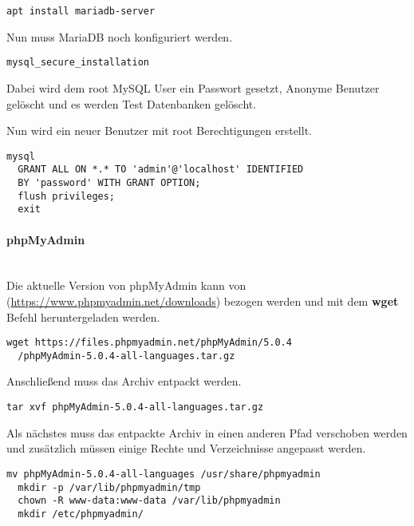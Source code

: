 \begin{lstlisting}[caption={MariadB installieren}]
  apt install mariadb-server
\end{lstlisting}

Nun muss MariaDB noch konfiguriert werden.

\begin{lstlisting}[caption={MariaDB Secure Installation}]
  mysql_secure_installation
\end{lstlisting}

Dabei wird dem root MySQL User ein Passwort gesetzt, Anonyme Benutzer gelöscht
und es werden Test Datenbanken gelöscht.

Nun wird ein neuer Benutzer mit root Berechtigungen erstellt.

\begin{lstlisting}[caption={MariaDB Secure Installation}]
  mysql
  GRANT ALL ON *.* TO 'admin'@'localhost' IDENTIFIED 
  BY 'password' WITH GRANT OPTION;
  flush privileges;
  exit
\end{lstlisting}

\paragraph{phpMyAdmin}\mbox{}\\

Die aktuelle Version von phpMyAdmin kann von
(\url{https://www.phpmyadmin.net/downloads}) bezogen werden und mit dem
\textbf{wget} Befehl heruntergeladen werden.

\begin{lstlisting}[caption={phpMyAdmin Download}]
  wget https://files.phpmyadmin.net/phpMyAdmin/5.0.4
  /phpMyAdmin-5.0.4-all-languages.tar.gz
\end{lstlisting}

Anschließend muss das Archiv entpackt werden.

\begin{lstlisting}[caption={phpMyAdmin Entpacken}]
  tar xvf phpMyAdmin-5.0.4-all-languages.tar.gz
\end{lstlisting}

Als nächstes muss das entpackte Archiv in einen anderen Pfad verschoben werden
und zusätzlich müssen einige Rechte und Verzeichnisse angepasst werden.

\begin{lstlisting}[caption={phpMyAdmin Rechte und Verzeichnisse}]
  mv phpMyAdmin-5.0.4-all-languages /usr/share/phpmyadmin
  mkdir -p /var/lib/phpmyadmin/tmp
  chown -R www-data:www-data /var/lib/phpmyadmin
  mkdir /etc/phpmyadmin/
\end{lstlisting}

